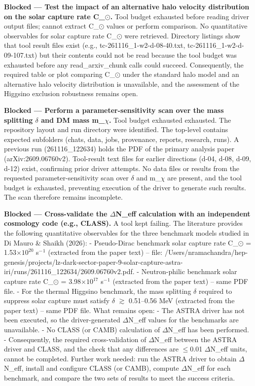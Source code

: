\documentclass[11pt,a4paper]{article}
\begin{document}
\textbf{Blocked --- Test the impact of an alternative halo velocity distribution on the solar capture rate C\_$\odot$.} Tool budget exhausted before reading driver output files; cannot extract C\_$\odot$ values or perform comparison. No quantitative observables for solar capture rate C\_$\odot$ were retrieved. Directory listings show that tool result files exist (e.g., tc-261116\_1-w2-d-08-40.txt, tc-261116\_1-w2-d-09-107.txt) but their contents could not be read because the tool budget was exhausted before any read\_arxiv\_chunk calls could succeed. Consequently, the required table or plot comparing C\_$\odot$ under the standard halo model and an alternative halo velocity distribution is unavailable, and the assessment of the Higgsino exclusion robustness remains open.

\textbf{Blocked --- Perform a parameter-sensitivity scan over the mass splitting $\delta$ and DM mass m\_$\chi$.} Tool budget exhausted exhausted. The repository layout and run directory were identified. The top-level contains expected subfolders (chats, data, jobs, provenance, reports, research, runs). A previous run (261116\_122634) holds the PDF of the primary analysis paper (arXiv:2609.06760v2). Tool-result text files for earlier directions (d-04, d-08, d-09, d-12) exist, confirming prior driver attempts. No data files or results from the requested parameter-sensitivity scan over $\delta$ and m\_$\chi$ are present, and the tool budget is exhausted, preventing execution of the driver to generate such results. The scan therefore remains incomplete.

\textbf{Blocked --- Cross-validate the $\Delta$N\_eff calculation with an independent cosmology code (e.g., CLASS).} A tool kept failing. The literature provides the following quantitative observables for the three benchmark models studied in Di Mauro \& Shaikh (2026): - Pseudo-Dirac benchmark solar capture rate C\_$\odot$ = 1.53$\times$$10^{20}$ s$^-$$^1$ (extracted from the paper text) -- file: /Users/nramachandra/hep-genesis/projects/lz-dark-sector-paper-9-solar-capture-astra-iri/runs/261116\_122634/2609.06760v2.pdf. - Neutron-philic benchmark solar capture rate C\_$\odot$ = 3.98$\times$$10^{17}$ s$^-$$^1$ (extracted from the paper text) -- same PDF file. - For the thermal Higgsino benchmark, the mass splitting $\delta$ required to suppress solar capture must satisfy $\delta$ $\gtrsim$ 0.51--0.56 MeV (extracted from the paper text) -- same PDF file. What remains open: - The ASTRA driver has not been executed, so the driver-generated $\Delta$N\_eff values for the benchmarks are unavailable. - No CLASS (or CAMB) calculation of $\Delta$N\_eff has been performed. - Consequently, the required cross-validation of $\Delta$N\_eff between the ASTRA driver and CLASS, and the check that any differences are $\leq$0.01 $\Delta$N\_eff units, cannot be completed. Further work needed: run the ASTRA driver to obtain $\Delta$N\_eff, install and configure CLASS (or CAMB), compute $\Delta$N\_eff for each benchmark, and compare the two sets of results to meet the success criteria.
\end{document}
